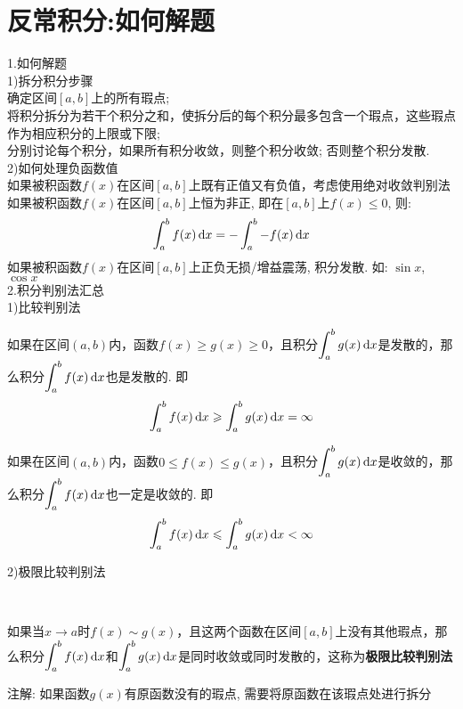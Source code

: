 \chapter{反常积分:如何解题}
1.如何解题\\
1)拆分积分步骤\\
确定区间$[a,b]$上的所有瑕点;\\
将积分拆分为若干个积分之和，使拆分后的每个积分最多包含一个瑕点，这些瑕点作为相应积分的上限或下限;\\
分别讨论每个积分，如果所有积分收敛，则整个积分收敛; 否则整个积分发散.\\[2ex]

2)如何处理负函数值\\
如果被积函数$f(x)$在区间$[a,b]$上既有正值又有负值，考虑使用绝对收敛判别法\\
如果被积函数$f(x)$在区间$[a,b]$上恒为非正, 即在$[a,b]$上$f(x)\leq0$, 则:
\[\int_a^bf(x)\mathop{}\!\mathrm{d} x=-\int_a^b-f(x)\mathop{}\!\mathrm{d} x\]
如果被积函数$f(x)$在区间$[a,b]$上正负无损/增益震荡, 积分发散. 如: $\sin x$, $\cos x$\\[4ex]


2.积分判别法汇总\\
1)比较判别法
\begin{center}
\begin{boxedminipage}{\textwidth}
如果在区间$(a,b)$内，函数$f(x)\geqslant g(x)\geqslant 0$，且积分$\displaystyle\int_a^bg(x)\mathop{}\!\mathrm{d} x$是发散的，那么积分$\displaystyle\int_a^bf(x)\mathop{}\!\mathrm{d} x$也是发散的. 即
\[\int_a^bf(x)\mathop{}\!\mathrm{d} x\geqslant\int_a^bg(x)\mathop{}\!\mathrm{d} x=\infty\]
\end{boxedminipage}
\end{center}\vspace{2ex}

\begin{center}
\begin{boxedminipage}{\textwidth}
如果在区间$(a,b)$内，函数$0\leqslant f(x)\leqslant g(x)$，且积分$\displaystyle\int_a^bg(x)\mathop{}\!\mathrm{d} x$是收敛的，那么积分$\displaystyle\int_a^bf(x)\mathop{}\!\mathrm{d} x$也一定是收敛的. 即
\[\int_a^bf(x)\mathop{}\!\mathrm{d} x\leqslant\int_a^bg(x)\mathop{}\!\mathrm{d} x<\infty\]
\end{boxedminipage}
\end{center}\vspace{2ex}

2)极限比较判别法
\begin{center}
\\[2ex]
\begin{boxedminipage}{\textwidth}
如果当$x\to a$时$f(x)\sim g(x)$，且这两个函数在区间$[a,b]$上没有其他瑕点，那么积分$\displaystyle\int_a^bf(x)\mathop{}\!\mathrm{d} x$和$\displaystyle\int_a^bg(x)\mathop{}\!\mathrm{d} x$是同时收敛或同时发散的，这称为\textbf{极限比较判别法}
\end{boxedminipage}
\end{center}
注解: 如果函数$g(x)$有原函数没有的瑕点, 需要将原函数在该瑕点处进行拆分\\[2ex]

